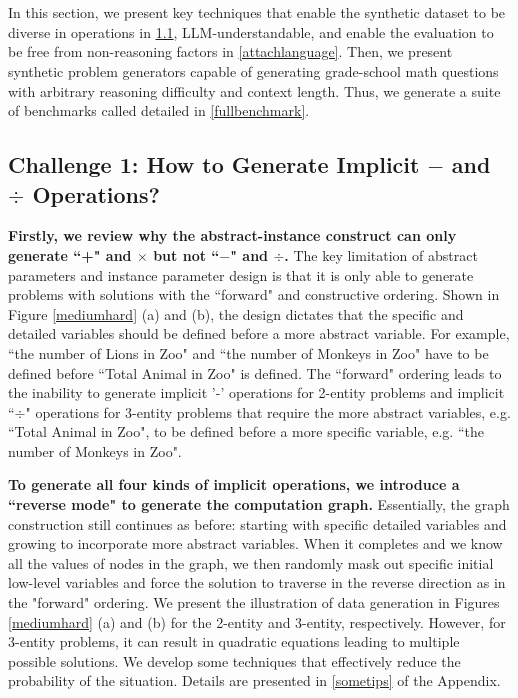 \section{\sysb} 
\label{gsminfinite} 

In this section, we present key techniques that enable the synthetic dataset to be diverse in operations in \cref{reverseproblem}, LLM-understandable, and enable the evaluation to be free from non-reasoning factors in \cref{attachlanguage}. Then, we present synthetic problem generators capable of generating grade-school math questions with arbitrary reasoning difficulty and context length. Thus, we generate a suite of benchmarks called \sysb detailed in \cref{fullbenchmark}. 

\subsection{Challenge 1: How to Generate Implicit $-$ and $\div$ Operations?} 
\label{reverseproblem} 
\textbf{Firstly, we review why the abstract-instance construct can only generate ``+" and $\times$ but not ``$-$" and $\div$.} 
The key limitation of \citet{ye2024physicslanguagemodels21} abstract parameters and instance parameter design is that it is only able to generate problems with solutions with the ``forward" and constructive ordering. Shown in Figure \ref{mediumhard} (a) and (b), the design dictates that the specific and detailed variables should be defined before a more abstract variable. For example, ``the number of Lions in Zoo" and ``the number of Monkeys in Zoo" have to be defined before ``Total Animal in Zoo" is defined. 
The ``forward" ordering leads to the inability to generate implicit '-' operations for 2-entity problems and implicit ``$\div$" operations for 3-entity problems that require the more abstract variables, e.g. ``Total Animal in Zoo", to be defined before a more specific variable, e.g. ``the number of Monkeys in Zoo". 

\textbf{To generate all four kinds of implicit operations, we introduce a ``reverse mode" to generate the computation graph.} 
Essentially, the graph construction still continues as before: starting with specific detailed variables and growing to incorporate more abstract variables. When it completes and we know all the values of nodes in the graph, we then randomly mask out specific initial low-level variables and force the solution to traverse in the reverse direction as in the "forward" ordering. 
We present the illustration of data generation in Figures \ref{mediumhard} (a) and (b) for the 2-entity and 3-entity, respectively. 
However, for 3-entity problems, it can result in quadratic equations leading to multiple possible solutions. We develop some techniques that effectively reduce the probability of the situation. Details are presented in \cref{sometips} of the Appendix. 
\label{reverse_problem} 

